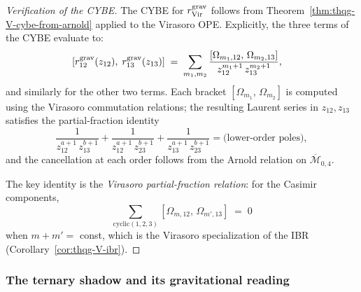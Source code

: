 \begin{proof}[Verification of the CYBE]
The CYBE for $r^{\mathrm{grav}}_{\mathrm{Vir}}$ follows from
Theorem~\ref{thm:thqg-V-cybe-from-arnold} applied to the Virasoro
OPE. Explicitly, the three terms of the CYBE evaluate to:
\begin{align}
&[r^{\mathrm{grav}}_{12}(z_{12}),\;r^{\mathrm{grav}}_{13}(z_{13})]
\;=\;
\sum_{m_1,m_2}
\frac{[\Omega_{m_1,12},\,\Omega_{m_2,13}]}
 {z_{12}^{m_1+1}\,z_{13}^{m_2+1}},
\end{align}
and similarly for the other two terms. Each bracket
$[\Omega_{m_1},\,\Omega_{m_2}]$ is computed using the Virasoro
commutation relations; the resulting Laurent series in $z_{12}, z_{13}$
satisfies the partial-fraction identity
\[
\frac{1}{z_{12}^{a+1}\,z_{13}^{b+1}}
+
\frac{1}{z_{12}^{a+1}\,z_{23}^{b+1}}
+
\frac{1}{z_{13}^{a+1}\,z_{23}^{b+1}}
=
\text{(lower-order poles)},
\]
and the cancellation at each order follows from the Arnold relation
on $\overline{\mathcal{M}}_{0,4}$.

The key identity is the \emph{Virasoro partial-fraction relation}:
for the Casimir components,
\begin{equation}%
\sum_{\text{cyclic}(1,2,3)}
[\Omega_{m,12},\,\Omega_{m',13}]
\;=\;
0
\end{equation}
when $m + m' = $ const, which is the Virasoro
specialization of the IBR
(Corollary~\ref{cor:thqg-V-ibr}).
\end{proof}


\subsubsection{The ternary shadow and its gravitational reading}

